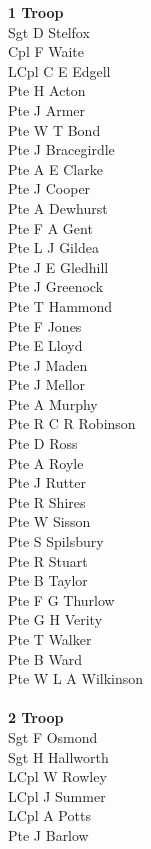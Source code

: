 \begin{multicols}{3}
  \small
  \noindent
  \textbf{1 Troop} \\
  Sgt D Stelfox \\
  Cpl F Waite \\
  LCpl C E Edgell \\
  Pte H Acton \\
  Pte J Armer \\
  Pte W T Bond \\
  Pte J Bracegirdle \\
  Pte A E Clarke \\
  Pte J Cooper \\
  Pte A Dewhurst \\
  Pte F A Gent \\
  Pte L J Gildea \\
  Pte J E Gledhill \\
  Pte J Greenock \\
  Pte T Hammond \\
  Pte F Jones \\
  Pte E Lloyd \\
  Pte J Maden \\
  Pte J Mellor \\
  Pte A Murphy \\
  Pte R C R Robinson \\
  Pte D Ross \\
  Pte A Royle \\
  Pte J Rutter \\
  Pte R Shires \\
  Pte W Sisson \\
  Pte S Spilsbury \\
  Pte R Stuart \\
  Pte B Taylor \\
  Pte F G Thurlow \\
  Pte G H Verity \\
  Pte T Walker \\
  Pte B Ward \\
  Pte W L A Wilkinson \\
  \\
  \textbf{2 Troop} \\
  Sgt F Osmond \\
  Sgt H Hallworth \\
  LCpl W Rowley \\
  LCpl J Summer \\
  LCpl A Potts \\
  Pte J Barlow \\

\end{multicols}
